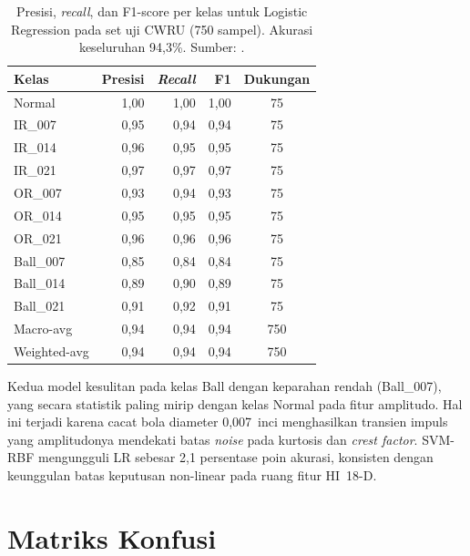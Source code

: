 \begin{table}[ht]
  \centering
  \caption{Presisi, \emph{recall}, dan F1-score per kelas untuk
           Logistic Regression pada set uji CWRU (750 sampel).
           Akurasi keseluruhan 94,3\%.
           Sumber: .}
  \label{tab:lampE_f1_lr}
  \footnotesize
  \begin{tabular}{@{}lrrrc@{}}
    \toprule
    \textbf{Kelas} & \textbf{Presisi} & \textbf{\emph{Recall}} & \textbf{F1} & \textbf{Dukungan} \\
    \midrule
    Normal        & 1,00 & 1,00 & 1,00 & 75 \\
    IR\_007       & 0,95 & 0,94 & 0,94 & 75 \\
    IR\_014       & 0,96 & 0,95 & 0,95 & 75 \\
    IR\_021       & 0,97 & 0,97 & 0,97 & 75 \\
    OR\_007       & 0,93 & 0,94 & 0,93 & 75 \\
    OR\_014       & 0,95 & 0,95 & 0,95 & 75 \\
    OR\_021       & 0,96 & 0,96 & 0,96 & 75 \\
    Ball\_007     & 0,85 & 0,84 & 0,84 & 75 \\
    Ball\_014     & 0,89 & 0,90 & 0,89 & 75 \\
    Ball\_021     & 0,91 & 0,92 & 0,91 & 75 \\
    \midrule
    Macro-avg     & 0,94 & 0,94 & 0,94 & 750 \\
    Weighted-avg  & 0,94 & 0,94 & 0,94 & 750 \\
    \bottomrule
  \end{tabular}
\end{table}

Kedua model kesulitan pada kelas Ball dengan keparahan rendah
(Ball\_007), yang secara statistik paling mirip dengan kelas Normal
pada fitur amplitudo. Hal ini terjadi karena cacat bola diameter
0,007~inci menghasilkan transien impuls yang amplitudonya mendekati
batas \emph{noise} pada kurtosis dan \emph{crest factor}. SVM-RBF
mengungguli LR sebesar 2,1 persentase poin akurasi, konsisten dengan
keunggulan batas keputusan non-linear pada ruang fitur HI~18-D.

\section{Matriks Konfusi}
\label{lamp:svmlr_cm}

